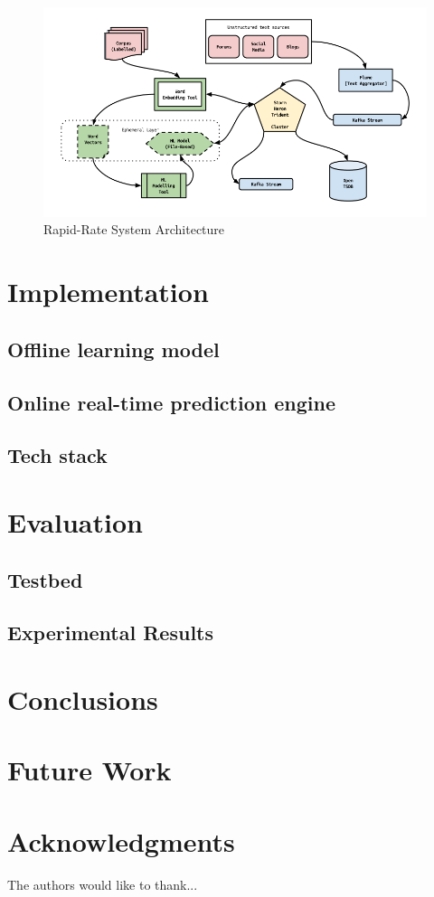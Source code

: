 \documentclass[conference]{IEEEtran}
\begin{document}
\begin{figure}[ht]
\centering
\includegraphics[width=\textwidth]{images/rapid_rate_system_arch_1.png}
\caption{Rapid-Rate System Architecture}
\label{fig:system-architecture}
\end{figure}


\section{Implementation}

\subsection{Offline learning model}

\subsection{Online real-time prediction engine}

\subsection{Tech stack}


\section{Evaluation}

\subsection{Testbed}

\subsection{Experimental Results}


\section{Conclusions}


\section{Future Work}


\section{Acknowledgments}
The authors would like to thank...




\end{document}
